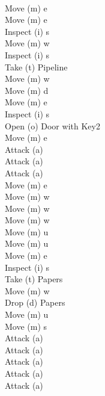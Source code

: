 \documentclass[10.9pt,a4paper]{article}
\begin{document}
\begin{itemize}
\begin{multicols}{3}
          \\Move (m) e
          \\Move (m) e
          \\Inspect (i) s
          \\Move (m) w
          \\Inspect (i) s
          \\Take (t) Pipeline
          \\Move (m) w
          \\Move (m) d
          \\Move (m) e
          \\Inspect (i) s
          \\Open (o) Door with Key2
          \\Move (m) e
          \\Attack (a)
          \\Attack (a)
          \\Attack (a)
          \\Move (m) e
          \\Move (m) w
          \\Move (m) w
          \\Move (m) w
          \\Move (m) u
          \\Move (m) u
          \\Move (m) e
          \\Inspect (i) s
          \\Take (t) Papers
          \\Move (m) w
          \\Drop (d) Papers
          \\Move (m) u
          \\Move (m) s
          \\Attack (a)
          \\Attack (a)
          \\Attack (a)
          \\Attack (a)
          \\Attack (a)
        \end{multicols}





\end{itemize}
\begin{tikzpicture}

\end{tikzpicture}


\vskip 3mm
\end{document}
